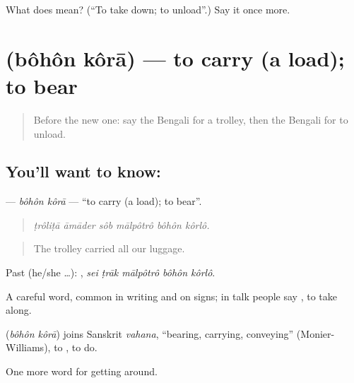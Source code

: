 \begin{tcolorbox}[breakable,colback=teal!4,colframe=teal!35!black,title={Before you move on}]
What does  mean? (\textquotedblleft{}To take down; to unload\textquotedblright{}.) Say it once more.
\end{tcolorbox}
\section[\texorpdfstring{\bn{বহন} \bn{করা} (bôhôn kôrā)}{বহন করা (bôhôn kôrā)}]{  (bôhôn kôrā) — to carry (a load); to bear}

\label{lesson:BN-C386-bohon-kora}



\begin{quote}
Before the new one: say the Bengali for a trolley, then the Bengali for to unload.
\end{quote}

\subsection*{You'll want to know:  }
\textbf{ } — \emph{bôhôn kôrā} — \textquotedblleft{}to carry (a load); to bear\textquotedblright{}.

\begin{quote}
     
\end{quote}

\begin{quote}
\emph{ṭrôliṭā āmāder sôb mālpôtrô bôhôn kôrlô.}
\end{quote}

\begin{quote}
The trolley carried all our luggage.
\end{quote}

Past (he/she …):     , \emph{sei ṭrāk mālpôtrô bôhôn kôrlô}.

A careful word, common in writing and on signs; in talk people say  , to take along.

\begin{cousinweb}
\textbf{ } (\emph{bôhôn kôrā}) joins Sanskrit \emph{vahana}, \textquotedblleft{}bearing, carrying, conveying\textquotedblright{} (Monier-Williams), to , to do.
\end{cousinweb}

\begin{grammarlens}[title={What you've built}]
One more word for getting around.
\end{grammarlens}

